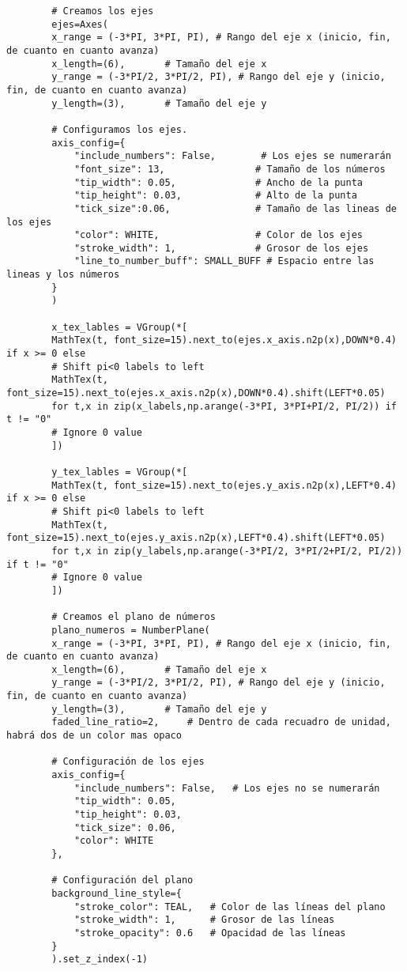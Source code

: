 \begin{longlisting}
\begin{verbatim}
		# Creamos los ejes
		ejes=Axes(
		x_range = (-3*PI, 3*PI, PI), # Rango del eje x (inicio, fin, de cuanto en cuanto avanza)
		x_length=(6),       # Tamaño del eje x
		y_range = (-3*PI/2, 3*PI/2, PI), # Rango del eje y (inicio, fin, de cuanto en cuanto avanza)
		y_length=(3),       # Tamaño del eje y
		
		# Configuramos los ejes.
		axis_config={
			"include_numbers": False,        # Los ejes se numerarán
			"font_size": 13,                # Tamaño de los números
			"tip_width": 0.05,              # Ancho de la punta
			"tip_height": 0.03,             # Alto de la punta
			"tick_size":0.06,               # Tamaño de las lineas de los ejes
			"color": WHITE,                 # Color de los ejes
			"stroke_width": 1,              # Grosor de los ejes
			"line_to_number_buff": SMALL_BUFF # Espacio entre las lineas y los números
		}       
		)
		
		x_tex_lables = VGroup(*[
		MathTex(t, font_size=15).next_to(ejes.x_axis.n2p(x),DOWN*0.4) if x >= 0 else
		# Shift pi<0 labels to left
		MathTex(t, font_size=15).next_to(ejes.x_axis.n2p(x),DOWN*0.4).shift(LEFT*0.05)
		for t,x in zip(x_labels,np.arange(-3*PI, 3*PI+PI/2, PI/2)) if t != "0"
		# Ignore 0 value
		])
		
		y_tex_lables = VGroup(*[
		MathTex(t, font_size=15).next_to(ejes.y_axis.n2p(x),LEFT*0.4) if x >= 0 else
		# Shift pi<0 labels to left
		MathTex(t, font_size=15).next_to(ejes.y_axis.n2p(x),LEFT*0.4).shift(LEFT*0.05)
		for t,x in zip(y_labels,np.arange(-3*PI/2, 3*PI/2+PI/2, PI/2)) if t != "0"
		# Ignore 0 value
		])
		
		# Creamos el plano de números
		plano_numeros = NumberPlane(
		x_range = (-3*PI, 3*PI, PI), # Rango del eje x (inicio, fin, de cuanto en cuanto avanza)
		x_length=(6),       # Tamaño del eje x
		y_range = (-3*PI/2, 3*PI/2, PI), # Rango del eje y (inicio, fin, de cuanto en cuanto avanza)
		y_length=(3),       # Tamaño del eje y
		faded_line_ratio=2,     # Dentro de cada recuadro de unidad, habrá dos de un color mas opaco
		
		# Configuración de los ejes
		axis_config={
			"include_numbers": False,   # Los ejes no se numerarán
			"tip_width": 0.05, 
			"tip_height": 0.03, 
			"tick_size": 0.06, 
			"color": WHITE
		},
		
		# Configuración del plano
		background_line_style={
			"stroke_color": TEAL,   # Color de las líneas del plano
			"stroke_width": 1,      # Grosor de las líneas
			"stroke_opacity": 0.6   # Opacidad de las líneas
		}
		).set_z_index(-1)
		

\end{verbatim}
\end{longlisting}
